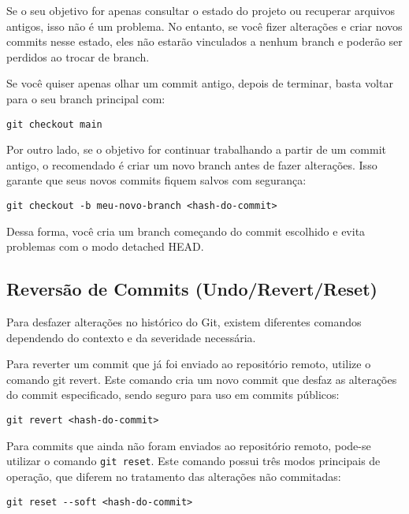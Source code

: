 Se o seu objetivo for apenas consultar o estado do projeto ou recuperar arquivos antigos, isso não é um problema. No entanto, se você fizer alterações e criar novos commits nesse estado, eles não estarão vinculados a nenhum branch e poderão ser perdidos ao trocar de branch.  

Se você quiser apenas olhar um commit antigo, depois de terminar, basta voltar para o seu branch principal com:

\begin{lstlisting}[style=shellstyle]
git checkout main
\end{lstlisting}

Por outro lado, se o objetivo for continuar trabalhando a partir de um commit antigo, o recomendado é criar um novo branch antes de fazer alterações. Isso garante que seus novos commits fiquem salvos com segurança:

\begin{lstlisting}[style=shellstyle]
git checkout -b meu-novo-branch <hash-do-commit>
\end{lstlisting}

Dessa forma, você cria um branch começando do commit escolhido e evita problemas com o modo detached HEAD.  

\subsection{Reversão de Commits (Undo/Revert/Reset)}

Para desfazer alterações no histórico do Git, existem diferentes comandos dependendo do contexto e da severidade necessária.

Para reverter um commit que já foi enviado ao repositório remoto, utilize o comando git revert. Este comando cria um novo commit que desfaz as alterações do commit especificado, sendo seguro para uso em commits públicos:

\begin{lstlisting}[style=shellstyle]
git revert <hash-do-commit>
\end{lstlisting}

Para commits que ainda não foram enviados ao repositório remoto, pode-se utilizar o comando \texttt{git reset}. Este comando possui três modos principais de operação, que diferem no tratamento das alterações não commitadas:

\begin{lstlisting}[style=shellstyle]
git reset --soft <hash-do-commit>
\end{lstlisting}


